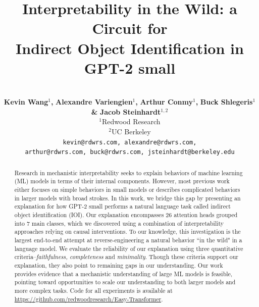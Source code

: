 \documentclass{article} %
\title{Interpretability in the Wild: a Circuit for\\Indirect Object Identification in GPT-2 small} %
\author{\\ \textbf{Kevin Wang}$^1$\textbf{,} \textbf{Alexandre Variengien}$^1$\textbf{,} \textbf{Arthur Conmy}$^1$\textbf{,} \textbf{Buck Shlegeris}$^1$ \textbf{\&} \textbf{Jacob Steinhardt}$^{1, 2}$ \\
$^1$Redwood Research\\
$^2$UC Berkeley\\
\texttt{kevin@rdwrs.com, alexandre@rdwrs.com,} \\ 
\texttt{arthur@rdwrs.com, buck@rdwrs.com, jsteinhardt@berkeley.edu}
}
\begin{document}

\maketitle

\begin{abstract}
Research in mechanistic interpretability seeks to explain behaviors of machine learning (ML) models in terms of their internal components. However, most previous work either focuses on simple behaviors in small models or describes complicated behaviors in larger models with broad strokes. In this work, we bridge this gap by presenting an explanation for how GPT-2 small performs a natural language task called indirect object identification (IOI). Our explanation encompasses 26 attention heads grouped into 7 main classes, which we discovered using a combination of interpretability approaches relying on causal interventions.
To our knowledge, this investigation is the largest end-to-end attempt at reverse-engineering a natural behavior ``in the wild" in a language model.  We evaluate the reliability of our explanation using three quantitative criteria--\emph{faithfulness, completeness} and \emph{minimality}. Though these criteria support our explanation, they also point to remaining gaps in our understanding. 
Our work provides evidence that a mechanistic understanding of large ML models is feasible, pointing toward opportunities to scale our understanding to both larger models and more complex tasks. Code for all experiments is available at \url{https://github.com/redwoodresearch/Easy-Transformer}.




\end{abstract}
\end{document}
